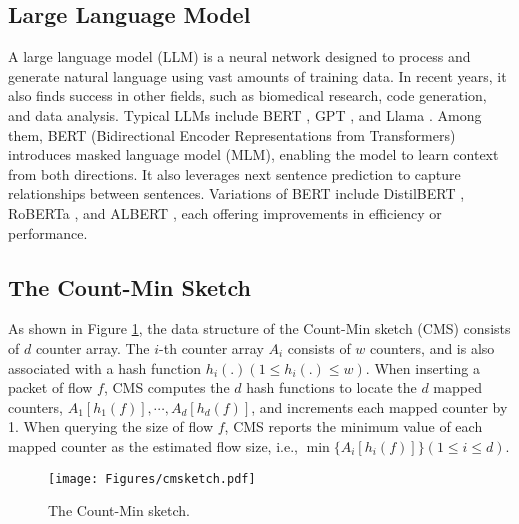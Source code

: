 \subsection{Large Language Model}

A large language model (LLM) is a neural network designed to process and generate natural language using vast amounts of training data. In recent years, it also finds success in other fields, such as biomedical research, code generation, and data analysis. Typical LLMs include BERT \cite{bert}, GPT \cite{gpt4}, and Llama \cite{llama2}. Among them, BERT (Bidirectional Encoder Representations from Transformers) introduces masked language model (MLM), enabling the model to learn context from both directions. It also leverages next sentence prediction to capture relationships between sentences. Variations of BERT include DistilBERT \cite{distilbert}, RoBERTa \cite{roberta}, and ALBERT \cite{albert}, each offering improvements in efficiency or performance.




\subsection{The Count-Min Sketch}

As shown in Figure \ref{fig:cms}, the data structure of the Count-Min sketch (CMS) consists of \(d\) counter array. The \(i\)-th counter array \(A_i\) consists of \(w\) counters, and is also associated with a hash function \(h_i(.) (1\leqslant h_i(.) \leqslant w)\).
%
When inserting a packet of flow \(f\), CMS computes the \(d\) hash functions to locate the \(d\) mapped counters, \(A_1[h_1(f)], \cdots, A_d[h_d(f)]\), and increments each mapped counter by 1.
%
When querying the size of flow \(f\), CMS reports the minimum value of each mapped counter as the estimated flow size, i.e., \(\min\{A_i[h_i(f)]\} (1\leqslant i \leqslant d)\).


\begin{figure}[!ht]
    \centering  
    \texttt{[image: Figures/cmsketch.pdf]}
    \caption{The Count-Min sketch.}
    \label{fig:cms}
\end{figure}
